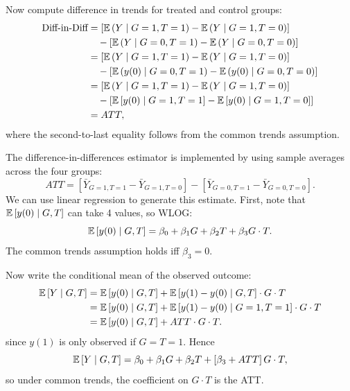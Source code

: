 \begin{proposition}
	Now compute difference in trends for treated and control groups:
	\begin{align*}
		\text{Diff-in-Diff}
		&= \left[\mathbb{E}\left(Y \mid G=1, T=1\right) - \mathbb{E}\left(Y \mid G=1, T=0\right)\right]\\
		& \quad- \left[\mathbb{E}\left(Y \mid G=0, T=1\right) - \mathbb{E}\left(Y \mid G=0, T=0\right)\right] \\
		&= \left[\mathbb{E}\left(Y \mid G=1, T=1\right) - \mathbb{E}\left(Y \mid G=1, T=0\right)\right] \\
		&\quad - \left[\mathbb{E}\left(y(0) \mid G=0, T=1\right) - \mathbb{E}\left(y(0) \mid G=0, T=0\right)\right] \\
		&= \left[\mathbb{E}\left(Y \mid G=1, T=1\right) - \mathbb{E}\left(Y \mid G=1, T=0\right)\right] \\
		&\quad - \left[ \mathbb{E}\left[y(0) \mid G=1, T= 1\right] - \mathbb{E}\left[y(0) \mid G = 1, T = 0\right]  \right] \\
		&= ATT
	,\end{align*}
	where the second-to-last equality follows from the common trends assumption.
\end{proposition}

\begin{proposition}
	The difference-in-differences estimator is implemented by using sample averages across the four groups:
	\[
		ATT = \left[\bar{Y}_{G=1,T=1} - \bar{Y}_{G=1,T=0}\right] - \left[\bar{Y}_{G=0,T=1} - \bar{Y}_{G=0,T=0}\right]
	.\]
	We can use linear regression to generate this estimate. First, note that $\mathbb{E}\left[y(0) \mid G, T\right]$ can take 4 values, so WLOG:
	\[
		\mathbb{E}\left[y(0) \mid G, T\right] = \beta_0 + \beta_1 G + \beta_2 T + \beta_3 G \cdot T
	.\]
	The common trends assumption holds iff $\beta_3 = 0$.

	Now write the conditional mean of the observed outcome:
	\begin{align*}
		\mathbb{E}\left[Y \mid G, T\right]
		&= \mathbb{E}\left[y(0) \mid G, T\right] + \mathbb{E}\left[y(1)-y(0) \mid G, T\right]\cdot G \cdot T \\
		&= \mathbb{E}\left[y(0) \mid G, T\right] + \mathbb{E}\left[y(1)-y(0) \mid G=1, T=1\right]\cdot G \cdot T \\
		&= \mathbb{E}\left[y(0) \mid G, T\right] + ATT \cdot G \cdot T
	.\end{align*}
	since $y(1)$ is only observed if $G=T=1$. Hence
	\[
		\mathbb{E}\left[Y \mid G, T\right] = \beta_0 + \beta_1 G + \beta_2 T + \left[\beta_3 + ATT\right]G \cdot T
	,\]
	so under common trends, the coefficient on $G \cdot T$ is the ATT.
\end{proposition}

